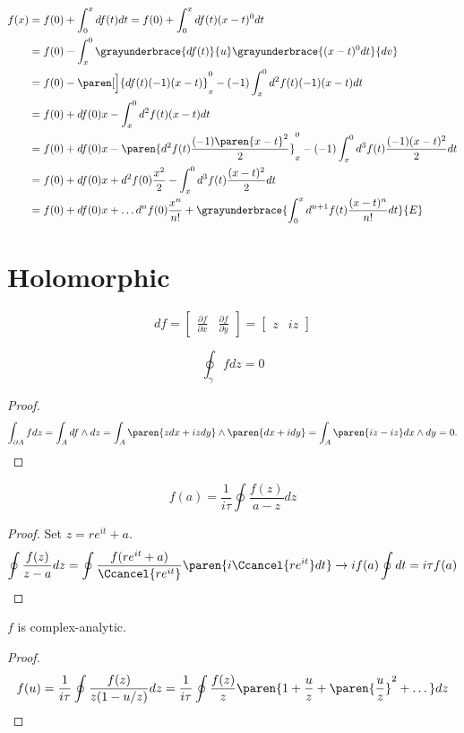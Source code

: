 \documentclass{scrartcl}
\begin{document}
\begin{align*}
  f(x) &= f(0) + \int_0^x df(t) dt = f(0) + \int_0^x df(t) (x-t)^0 dt  \\
       &=f(0) - \int_x^0 \grayunderbrace{df(t)}{u} \grayunderbrace{(x-t)^0 dt}{dv} \\
       &=f(0) - \paren[\Big]{df(t)(-1)(x-t)}_x^0 - (-1)\int_x^0 d^2f(t)(-1){(x-t)} dt \\
       &=f(0) + df(0)x - \int_x^0 d^2f(t){(x-t)} dt \\
       &=f(0) + df(0)x - \paren{d^2f(t)\frac{(-1)\paren{x-t}^2}2}_x^0 - (-1)\int_x^0 d^3f(t) \frac{(-1)(x-t)^2}{2} dt\\
       &=f(0) + df(0)x +d^2f(0)\frac{x^2}2 - \int_x^0 d^3f(t) \frac{(x-t)^2}{2} dt\\
       &=f(0) + df(0)x + \dots d^nf(0)\frac{x^n}{n!} + \grayunderbrace{\int_0^x d^{n+1}f(t) \frac{(x-t)^n}{n!}dt}{E}
\end{align*}
\section{Holomorphic}
\begin{theorem}
  \[
    df =
    \begin{bmatrix}
      \frac{\partial f}{\partial x} & \frac{\partial f}{\partial y}
    \end{bmatrix}
    =
    \begin{bmatrix}
      z &iz
    \end{bmatrix}
  \]
\end{theorem}

\begin{cor}
  \[
    \oint_{\gamma} f dz =0
  \]
\end{cor}
\begin{proof}
  \[
    \int_{\partial A} f dz = \int_A df \wedge dz = \int_A \paren{zdx+izdy}\wedge\paren{dx+idy} = \int_A \paren{iz-iz}dx\wedge dy =0.
  \]
\end{proof}

\begin{theorem}
  \[
    f(a) = \frac{1}{i\tau } \oint \frac{f(z)}{a-z} dz
  \]
\end{theorem}
\begin{proof}
  Set \(z=re^{it}+a\).
  \[
    \oint \frac{f(z)}{z-a} dz = \oint \frac{f(re^{it}+a)}{\Ccancel{re^{it}}} \paren{i\Ccancel{re^{it}}dt}  \to  if(a) \oint dt = i\tau  f(a)
  \]
\end{proof}

\begin{cor}
  \(f\) is complex-analytic.
\end{cor}
\begin{proof}
  \[
    f(u)  = \frac{1}{i\tau} \oint \frac{f(z)}{z(1-u/z)} dz= \frac{1}{i\tau}\oint \frac{f(z)}{z}\paren{1 + \frac{u}z +\paren{\frac{u}{z}}^2 + \dots}dz
  \]
\end{proof}
\end{document}

